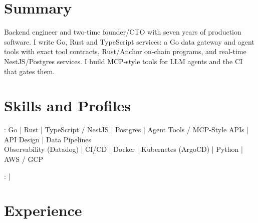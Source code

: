 \documentclass[print]{jack-resume}
\begin{document}
\pagecolor{darkmodeBackground}


\begin{minipage}[t][1cm][t]{.03\textwidth}
    \hfill
\end{minipage}

\section{Summary}
Backend engineer and two-time founder/CTO with seven years of production software. I write Go, Rust and TypeScript services: a Go data gateway and agent tools with exact tool contracts, Rust/Anchor on-chain programs, and real-time NestJS/Postgres services. I build MCP-style tools for LLM agents and the CI that gates them.
\sectionsep

\section{Skills and Profiles}
:
Go \hfill | \hfill
Rust \hfill | \hfill
TypeScript / NestJS \hfill | \hfill
Postgres \hfill | \hfill
Agent Tools / MCP-Style APIs \hfill | \hfill
API Design \hfill | \hfill
Data Pipelines \\
\hspace{1.0cm} Observability (Datadog) \hfill | \hfill
CI/CD \hfill | \hfill
Docker \hfill | \hfill
Kubernetes (ArgoCD) \hfill | \hfill
Python \hfill | \hfill
AWS / GCP \\

\raggedright{
    :
      \href{https://www.linkedin.com/in/jack-sturtevant/}{ \ExternalLink} |
     \href{https://github.com/jacksturt}{ \ExternalLink}}

\section{Experience}
\end{document}
